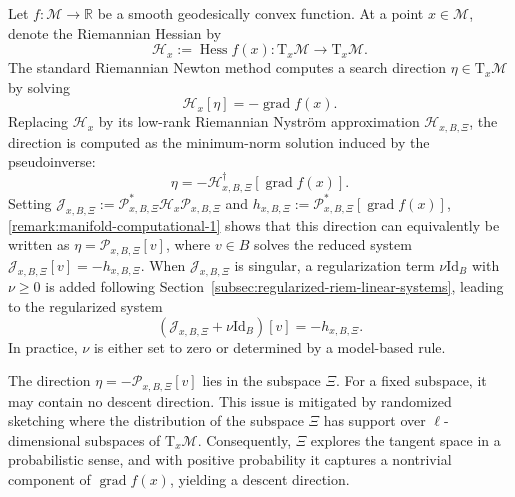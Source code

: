 \documentclass[final,onefignum,onetabnum]{siamart250211}
\DeclareMathOperator{\grad}{grad}
\newcommand{\Hess}{\operatorname{Hess}}
\begin{document}
Let $f\colon \mathcal M\to\mathbb R$ be a smooth geodesically convex function. At a point $x\in\mathcal M$, denote the Riemannian Hessian by
\[
\mathcal{H}_x:=\Hess f(x)\colon \mathrm{T}_x\mathcal M\to \mathrm{T}_x\mathcal M.
\] 
The standard Riemannian Newton method computes a search direction $\eta \in \mathrm{T}_x\mathcal M$ by solving
\[
\mathcal{H}_x [\eta] = -\grad f(x).
\]
Replacing $\mathcal{H}_x$ by its low-rank Riemannian Nystr\"om approximation $\mathcal{H}_{x, B, \Xi}$, the direction is computed as the minimum-norm solution induced by the pseudoinverse:
\[
\eta = -\mathcal{H}_{x, B, \Xi}^{\dagger}[\grad f(x)].
\]
Setting $\mathcal{J}_{x, B, \Xi} := \mathcal{P}_{x, B, \Xi}^* \mathcal{H}_x \mathcal{P}_{x, B, \Xi}$ and $h_{x, B, \Xi} := \mathcal{P}_{x, B, \Xi}^* [\grad f(x)]$, \cref{remark:manifold-computational-1} shows that this direction can equivalently be written as
$\eta = \mathcal{P}_{x, B, \Xi} [v]$, where $v \in B$ solves the reduced system $\mathcal{J}_{x, B, \Xi} [v] = - h_{x, B, \Xi}$.
When $\mathcal{J}_{x, B, \Xi}$ is singular, a regularization term $\nu \mathrm{Id}_B$ with $\nu \geq 0$ is added following Section~\ref{subsec:regularized-riem-linear-systems}, leading to the regularized system
\begin{equation}
  \label{eq: Newton step with regularization}
(\mathcal{J}_{x, B, \Xi}+\nu \mathrm{Id}_B) [v] = - h_{x, B, \Xi}.
\end{equation}
In practice, $\nu$ is either set to zero or determined by a model-based rule.




  

\begin{remark}
  The direction $\eta = -\mathcal{P}_{x, B, \Xi}[v]$ lies in the subspace $\Xi$. 
  For a fixed subspace, it may contain no descent direction.
  This issue is mitigated by randomized sketching where the distribution of the subspace $\Xi$ has support over $\ell$-dimensional subspaces of $\mathrm{T}_x\mathcal M$. Consequently, $\Xi$ explores the tangent space in a probabilistic sense, and with positive probability it captures a nontrivial component of $\grad f(x)$, yielding a descent direction. 
\end{remark}
\end{document}
